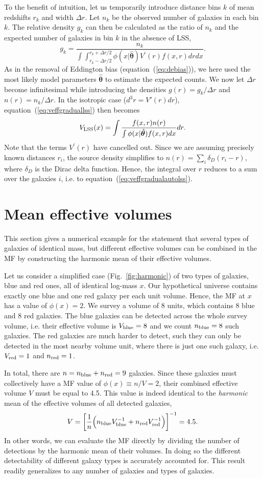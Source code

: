 \documentclass[a4paper,fleqn,usenatbib]{mnras}
\newcommand{\be}{\begin{equation}}
\newcommand{\ee}{\end{equation}}
\newcommand{\vefflss}{V_{\rm LSS}}%
\newcommand{\fig}[1]{Fig.~\ref{fig:#1}}
\newcommand{\eq}[1]{equation~(\ref{eq:#1})}
\newcommand{\ie}{i.e.\xspace}
\newcommand{\para}{{\bm{\theta}}}
\begin{document}
To the benefit of intuition, let us temporarily introduce distance bins $k$ of mean redshifts $r_k$ and width $\Delta r$. Let $n_k$ be the observed number of galaxies in each bin $k$. The relative density $g_k$ can then be calculated as the ratio of $n_k$ and the expected number of galaxies in bin $k$ in the absence of LSS,
%
\be\label{eq:LSSdeltak}
	g_k=\frac{n_k}{\int\int_{r_k-\Delta r/2}^{r_k+\Delta r/2}\phi(x|\hat\para)V^{\prime}(r)f(x,r)dr dx}.
\ee
%
As in the removal of Eddington bias (\eq{debias}), we here used the most likely model parameters $\hat\para$ to estimate the expected counts. We now let $\Delta r$ become infinitesimal while introducing the densities $g(r)=g_k/\Delta r$ and $n(r)=n_k/\Delta r$. In the isotropic case ($d^3r=V'(r)dr$), \eq{veffgraduallss} then becomes
%
\be\label{eq:veffgraduallss2}
	\vefflss(x) = \int \frac{f(x,r)n(r)}{\int\phi(x|\hat\para)f(x,r)dx}dr.
\ee
%
Note that the terms $V^\prime(r)$ have cancelled out. Since we are assuming precisely known distances $r_i$, the source density simplifies to $n(r)=\sum_i\delta_D(r_i-r)$, where $\delta_D$ is the Dirac delta function. Hence, the integral over $r$ reduces to a sum over the galaxies $i$, \ie to \eq{veffgradualautolss}.

\section{Mean effective volumes}\label{a:harmonic}

This section gives a numerical example for the statement that several types of galaxies of identical mass, but different effective volumes can be combined in the MF by constructing the harmonic mean of their effective volumes.

Let us consider a simplified case (\fig{harmonic}) of two types of galaxies, blue and red ones, all of identical log-mass $x$. Our hypothetical universe contains exactly one blue and one red galaxy per each unit volume. Hence, the MF at $x$ has a value of $\phi(x)=2$. We survey a volume of 8 units, which contains 8 blue and 8 red galaxies. The blue galaxies can be detected across the whole survey volume, \ie their effective volume is $V_{\rm blue}=8$ and we count $n_{\rm blue}=8$ such galaxies. The red galaxies are much harder to detect, such they can only be detected in the most nearby volume unit, where there is just one such galaxy, \ie $V_{\rm red}=1$ and  $n_{\rm red}=1$.

In total, there are $n=n_{\rm blue}+n_{\rm red}=9$ galaxies. Since these galaxies must collectively have a MF value of $\phi(x)\equiv n/V=2$, their combined effective volume $V$ must be equal to 4.5. This value is indeed identical to the \emph{harmonic} mean of the effective volumes of all detected galaxies,
%
\be
	V = \left[\frac{1}{n}\Big(n_{\rm blue}V_{\rm blue}^{-1}+n_{\rm red}V_{\rm red}^{-1}\Big)\right]^{-1} = 4.5.
\ee
%
In other words, we can evaluate the MF directly by dividing the number of detections by the harmonic mean of their volumes. In doing so the different detectability of different galaxy types is accurately accounted for. This result readily generalizes to any number of galaxies and types of galaxies.
\end{document}
